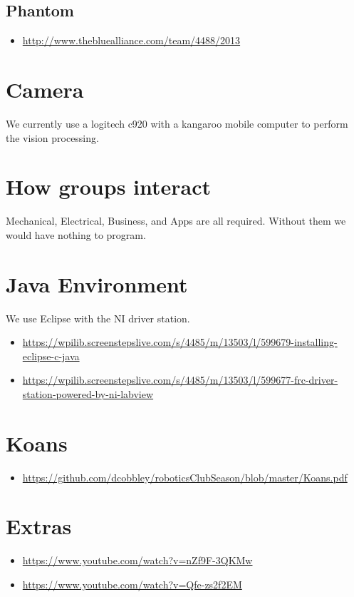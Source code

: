 \documentclass{article}
\begin{document}
\subsection{Phantom}
\begin{itemize}
\item[] \url{http://www.thebluealliance.com/team/4488/2013}
\end{itemize}



\section{Camera}
We currently use a logitech c920 with a kangaroo mobile computer to perform the vision processing.

\section{How groups interact}
Mechanical, Electrical, Business, and Apps are all required. Without them we would have nothing to program.

\section{Java Environment}
We use Eclipse with the NI driver station.

\begin{itemize}
\item[] \url{https://wpilib.screenstepslive.com/s/4485/m/13503/l/599679-installing-eclipse-c-java}
\item[] \url{https://wpilib.screenstepslive.com/s/4485/m/13503/l/599677-frc-driver-station-powered-by-ni-labview}
\end{itemize}

\section{Koans}
\begin{itemize}
\item[] \url{https://github.com/dcobbley/roboticsClubSeason/blob/master/Koans.pdf}
\end{itemize}

\section{Extras}
\begin{itemize}
\item[] \url{https://www.youtube.com/watch?v=nZf9F-3QKMw}
\item[] \url{https://www.youtube.com/watch?v=Qfe-zs2f2EM}
\end{itemize}
\end{document}

